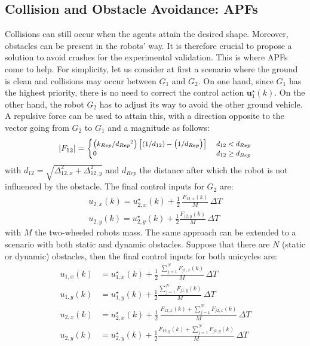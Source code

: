 \documentclass{ifacconf}
\begin{document}
\subsection{Collision and Obstacle Avoidance: APFs}
Collisions can still occur when the agents attain the desired shape.
Moreover, obstacles can be present in the robots' way.
It is therefore crucial to propose a solution to avoid crashes 
for the experimental validation.
This is where APFs come to help.
For simplicity, let us consider at first a scenario where the ground
is clean and collisions may occur between $G_1$ and $G_2$.
On one hand, since $G_1$ has the highest priority, 
there is no need to correct the control action 
$\boldsymbol{u}^\star_{1}(k)$.
On the other hand, the robot $G_2$ has to adjust 
its way to avoid the other ground vehicle.
A repulsive force can be used to attain this,
with a direction opposite to the vector going from $G_2$ to $G_1$
and a magnitude as follows:
\begin{equation}
    \footnotesize
    \left\lvert {F}_{12} \right\rvert  = \begin{cases}
       \left(k_{Rep}/{d_{Rep}}^2\right) \left[\left(1/d_{12}\right) - \left(1/d_{Rep}\right)\right]  \ & d_{12} < d_{Rep}\\
        0 \ & d_{12} \geq d_{Rep}\\
\end{cases} 
\end{equation}
with $d_{12} = \sqrt{\Delta_{12,x}^2 + \Delta_{12,y}^2}$ and 
$d_{Rep}$ the distance after which the robot is not influenced 
by the obstacle.
The final control inputs for $G_2$ are:
\begin{equation}
\begin{aligned}
    u_{2,x}(k) = u^\star_{2,x}(k) + \frac{1}{2}\,\frac{F_{12,x}(k)}{M}\, \Delta T \\
    u_{2,y}(k) = u^\star_{2,y}(k) + \frac{1}{2} \frac{F_{12,y}(k)}{M} \, \Delta T
\end{aligned}
\end{equation}
with $M$ the two-wheeled robots mass.
The same approach can be extended to a scenario with both static and dynamic obstacles.
Suppose that there are $N$ (static or dynamic) obstacles, 
then the final control inputs for both unicycles are:
\begin{equation}
\begin{aligned}
    u_{1,x}(k) &= u^\star_{1,x}(k) + \frac{1}{2}\,\frac{
        \sum^N_{j=1} F_{j1,x}(k)
        }{M}\, \Delta T \\
    u_{1,y}(k) &= u^\star_{1,y}(k) + \frac{1}{2} \frac{
        \sum^N_{j=1} F_{j1,y}(k)
        }{M} \, \Delta T \\
    u_{2,x}(k) &= u^\star_{2,x}(k) + \frac{1}{2}\,\frac{
        F_{12,x}(k) + \sum^N_{j=1} F_{j2,x}(k)
        }{M}\, \Delta T \\
    u_{2,y}(k) &= u^\star_{2,y}(k) + \frac{1}{2} \frac{
        F_{12,y}(k) + \sum^N_{j=1} F_{j2,y}(k)
        }{M} \, \Delta T
\end{aligned}
\end{equation}
\end{document}
